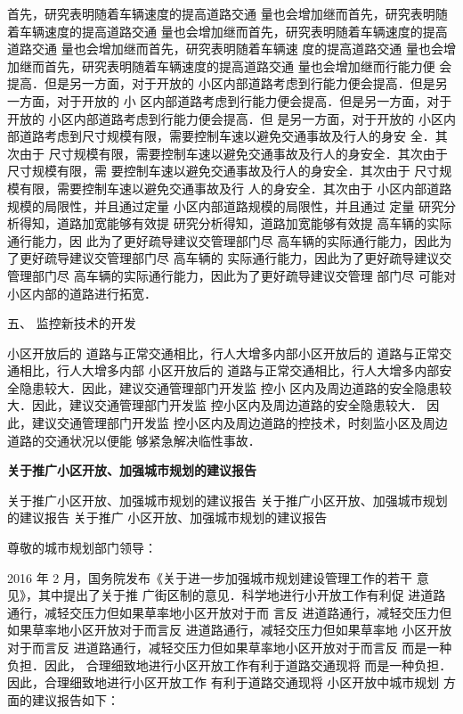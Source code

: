 首先，研究表明随着车辆速度的提高道路交通 量也会增加继而首先，研究表明随着车辆速度的提高道路交通
 量也会增加继而首先，研究表明随着车辆速度的提高道路交通 量也会增加继而首先，研究表明随着车辆速
 度的提高道路交通 量也会增加继而首先，研究表明随着车辆速度的提高道路交通 量也会增加继而行能力便
 会提高．但是另一方面，对于开放的 小区内部道路考虑到行能力便会提高．但是另一方面，对于开放的 小
 区内部道路考虑到行能力便会提高．但是另一方面，对于开放的 小区内部道路考虑到行能力便会提高．但
 是另一方面，对于开放的 小区内部道路考虑到尺寸规模有限，需要控制车速以避免交通事故及行人的身安
 全．其次由于 尺寸规模有限，需要控制车速以避免交通事故及行人的身安全．其次由于 尺寸规模有限，需
 要控制车速以避免交通事故及行人的身安全．其次由于 尺寸规模有限，需要控制车速以避免交通事故及行
 人的身安全．其次由于 小区内部道路规模的局限性，并且通过定量 小区内部道路规模的局限性，并且通过
 定量 研究分析得知，道路加宽能够有效提 研究分析得知，道路加宽能够有效提 高车辆的实际通行能力，因
 此为了更好疏导建议交管理部门尽 高车辆的实际通行能力，因此为了更好疏导建议交管理部门尽 高车辆的
 实际通行能力，因此为了更好疏导建议交管理部门尽 高车辆的实际通行能力，因此为了更好疏导建议交管理
 部门尽 可能对小区内部的道路进行拓宽．

五、 监控新技术的开发

小区开放后的 道路与正常交通相比，行人大增多内部小区开放后的 道路与正常交通相比，行人大增多内部
小区开放后的 道路与正常交通相比，行人大增多内部安全隐患较大．因此，建议交通管理部门开发监 控小
区内及周边道路的安全隐患较大．因此，建议交通管理部门开发监 控小区内及周边道路的安全隐患较大．
因此，建议交通管理部门开发监 控小区内及周边道路的控技术，时刻监小区及周边道路的交通状况以便能
够紧急解决临性事故．

\begin{center}\textbf{关于推广小区开放、加强城市规划的建议报告}\end{center}

 关于推广小区开放、加强城市规划的建议报告 关于推广小区开放、加强城市规划的建议报告 关于推广
 小区开放、加强城市规划的建议报告

尊敬的城市规划部门领导：

2016 年 2 月，国务院发布《关于进一步加强城市规划建设管理工作的若干 意见》，其中提出了关于推
广街区制的意见．科学地进行小开放工作有利促 进道路通行，减轻交压力但如果草率地小区开放对于而
言反 进道路通行，减轻交压力但如果草率地小区开放对于而言反 进道路通行，减轻交压力但如果草率地
小区开放对于而言反 进道路通行，减轻交压力但如果草率地小区开放对于而言反 而是一种负担．因此，
合理细致地进行小区开放工作有利于道路交通现将 而是一种负担．因此，合理细致地进行小区开放工作
有利于道路交通现将 小区开放中城市规划 方面的建议报告如下：

